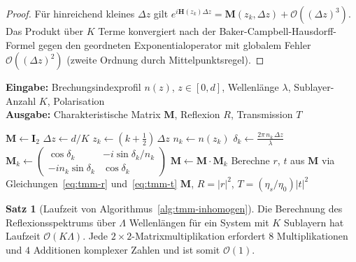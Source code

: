 ﻿\documentclass[a4paper,12pt]{article}
\theoremstyle{definition}
\newtheorem{satz}{Satz}[section]
\newcommand{\ordre}[1]{\mathcal{O}\!\left(#1\right)}
\newcommand{\matr}[1]{\mathbf{#1}}
\begin{document}
	\begin{proof}
		Für hinreichend kleines $\Delta z$ gilt $e^{i\matr{H}(z_k)\Delta z}
		= \matr{M}(z_k, \Delta z) + \ordre{(\Delta z)^3}$.
		Das Produkt über $K$ Terme konvergiert nach der Baker-Campbell-Hausdorff-Formel
		gegen den geordneten Exponentialoperator mit globalem Fehler $\ordre{(\Delta z)^2}$
		(zweite Ordnung durch Mittelpunktsregel).
	\end{proof}
	
	\begin{algorithm}[htb]
		\caption{TMM für inhomogene Schicht mit kontinuierlichem $n(z)$-Profil}
		\label{alg:tmm-inhomogen}
		\textbf{Eingabe:} Brechungsindexprofil $n(z)$, $z \in [0, d]$,
		Wellenlänge $\lambda$, Sublayer-Anzahl $K$, Polarisation\\
		\textbf{Ausgabe:} Charakteristische Matrix $\matr{M}$, Reflexion $R$, Transmission $T$
		\begin{algorithmic}[1]
			\State $\matr{M} \gets \matr{I}_2$ 
			\State $\Delta z \gets d / K$
			\State $z_k \gets (k + \tfrac{1}{2})\,\Delta z$ 
			\State $n_k \gets n(z_k)$ 
			\State $\delta_k \gets \frac{2\pi\, n_k\, \Delta z}{\lambda}$
			\State $\matr{M}_k \gets \begin{pmatrix}
				\cos\delta_k & -i\sin\delta_k/n_k \\
				-in_k\sin\delta_k & \cos\delta_k
			\end{pmatrix}$
			\State $\matr{M} \gets \matr{M} \cdot \matr{M}_k$ 
			\EndFor
			\State Berechne $r$, $t$ aus $\matr{M}$ via Gleichungen~\eqref{eq:tmm-r}
			und~\eqref{eq:tmm-t}
			\State \Return $\matr{M}$, $R = |r|^2$, $T = (\eta_s/\eta_0)|t|^2$
		\end{algorithmic}
	\end{algorithm}
	
	\begin{satz}[Laufzeit von Algorithmus~\ref{alg:tmm-inhomogen}]
		\label{satz:tmm-laufzeit}
		Die Berechnung des Reflexionsspektrums über $\Lambda$ Wellenlängen
		für ein System mit $K$ Sublayern hat Laufzeit $\ordre{K\Lambda}$.
		Jede $2\times 2$-Matrixmultiplikation erfordert $8$ Multiplikationen
		und $4$ Additionen komplexer Zahlen und ist somit $\ordre{1}$.
	\end{satz}
	
\end{document}
